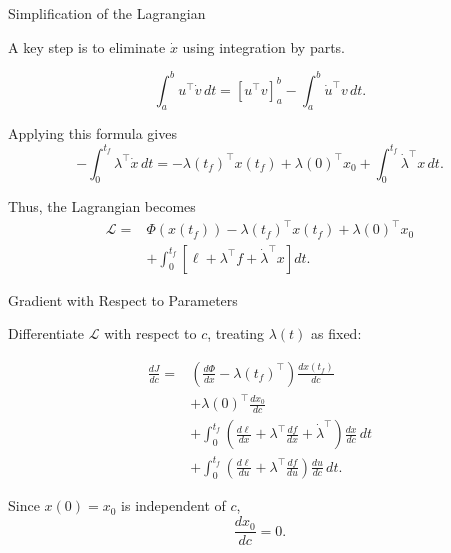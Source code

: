 \documentclass{beamer}
\begin{document}
\begin{frame}{Simplification of the Lagrangian}
	\begin{flushleft}
		A key step is to eliminate $\dot{x}$ using integration
		by parts.
		
		\begin{theorem}
			\[
			\int_a^b u^\top\dot{v}\,dt
			=
			\left[u^\top v\right]_a^b
			-\int_a^b \dot{u}^\top v\,dt.
			\]
		\end{theorem}
		
		Applying this formula gives
		\[
		-\int_0^{t_f}\lambda^\top\dot{x}\,dt
		=
		-\lambda(t_f)^\top x(t_f)
		+\lambda(0)^\top x_0
		+\int_0^{t_f}\dot{\lambda}^\top x\,dt.
		\]
		
		Thus, the Lagrangian becomes
		\[
		\boxed{
			\begin{aligned}
				\mathcal{L}
				={}&\Phi(x(t_f))-\lambda(t_f)^\top x(t_f)+\lambda(0)^\top x_0\\
				&+\int_0^{t_f}
				\left[\ell+\lambda^\top f+
				\dot{\lambda}^\top x\right]dt.
			\end{aligned}
		}
		\]
	\end{flushleft}
\end{frame}

\begin{frame}{Gradient with Respect to Parameters}
	\begin{flushleft}
		Differentiate $\mathcal{L}$ with respect to $c$,
		treating $\lambda(t)$ as fixed:
		
		\[
		\begin{aligned}
			\frac{dJ}{dc}
			={}&
			\left(\frac{d\Phi}{dx}
			-\lambda(t_f)^\top\right)
			\frac{dx(t_f)}{dc}\\
			&+\lambda(0)^\top\frac{dx_0}{dc}\\
			&+\int_0^{t_f}
			\left(
			\frac{d\ell}{dx}
			+\lambda^\top\frac{df}{dx}
			+\dot{\lambda}^\top
			\right)\frac{dx}{dc}\,dt\\
			&+\int_0^{t_f}
			\left(
			\frac{d\ell}{du}
			+\lambda^\top\frac{df}{du}
			\right)\frac{du}{dc}\,dt.
		\end{aligned}
		\]
		
		\bigskip
		
		Since $x(0)=x_0$ is independent of $c$,
		\[
		\frac{dx_0}{dc}=0.
		\]
	\end{flushleft}
\end{frame}
\end{document}
